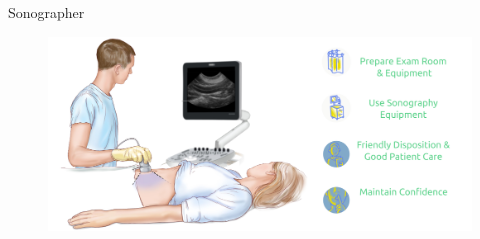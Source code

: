 {
    \begin{frame}{Sonographer}
      \begin{figure}
        \centering
        \includegraphics[width=1.0\textwidth]{./../figures/sonographer/versions/drawing-v02.png}
      \end{figure}
\end{frame}
}